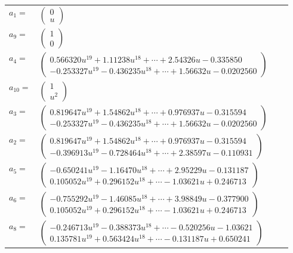 \documentclass[1p]{elsarticle_modified}
\theoremstyle{definition}
\begin{document}
\begin{tabular}{m{7pt} m{180pt} m{7pt} m{180pt} }
\flushright $a_{1}=$&$\begin{pmatrix}0\\u\end{pmatrix}$ \\
\flushright $a_{9}=$&$\begin{pmatrix}1\\0\end{pmatrix}$ \\
\flushright $a_{4}=$&$\begin{pmatrix}0.566320 u^{19}+1.11238 u^{18}+\cdots+2.54326 u-0.335850\\-0.253327 u^{19}-0.436235 u^{18}+\cdots+1.56632 u-0.0202560\end{pmatrix}$ \\
\flushright $a_{10}=$&$\begin{pmatrix}1\\u^2\end{pmatrix}$ \\
\flushright $a_{3}=$&$\begin{pmatrix}0.819647 u^{19}+1.54862 u^{18}+\cdots+0.976937 u-0.315594\\-0.253327 u^{19}-0.436235 u^{18}+\cdots+1.56632 u-0.0202560\end{pmatrix}$ \\
\flushright $a_{2}=$&$\begin{pmatrix}0.819647 u^{19}+1.54862 u^{18}+\cdots+0.976937 u-0.315594\\-0.396913 u^{19}-0.728464 u^{18}+\cdots+2.38597 u-0.110931\end{pmatrix}$ \\
\flushright $a_{5}=$&$\begin{pmatrix}-0.650241 u^{19}-1.16470 u^{18}+\cdots+2.95229 u-0.131187\\0.105052 u^{19}+0.296152 u^{18}+\cdots-1.03621 u+0.246713\end{pmatrix}$ \\
\flushright $a_{6}=$&$\begin{pmatrix}-0.755292 u^{19}-1.46085 u^{18}+\cdots+3.98849 u-0.377900\\0.105052 u^{19}+0.296152 u^{18}+\cdots-1.03621 u+0.246713\end{pmatrix}$ \\
\flushright $a_{8}=$&$\begin{pmatrix}-0.246713 u^{19}-0.388373 u^{18}+\cdots-0.520256 u-1.03621\\0.135781 u^{19}+0.563424 u^{18}+\cdots-0.131187 u+0.650241\end{pmatrix}$ \\

\end{tabular}
\end{document}
